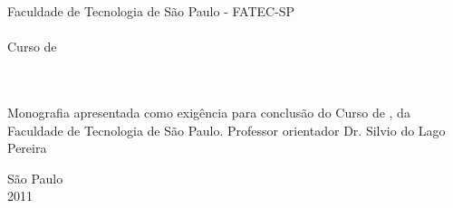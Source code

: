 \thispagestyle{empty}

\begin{center}
Faculdade de Tecnologia de São Paulo - FATEC-SP \\
\DTI \\
Curso de \PD \\
\vspace{2.5cm}
\TITLE \\
\vspace{2.5cm}
\large \BBC \\
\vspace{3cm}
\hspace{7cm} \begin{minipage}{0.5\textwidth}
Monografia apresentada como exigência para conclusão do Curso de \PD,
da Faculdade de Tecnologia de São Paulo. Professor
orientador Dr. Silvio do Lago Pereira
\end{minipage}
\vspace{4cm}

\large São Paulo \\ 2011
\end{center}
